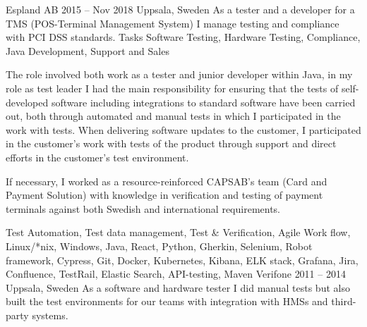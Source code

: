 \documentclass{sobCV}[2015/09/08]
\begin{document}
   {Espland AB}
   {2015 -- Nov 2018}
   {Uppsala, Sweden}{
       As a tester and a developer for a TMS (POS-Terminal Management System) I
       manage testing and compliance with PCI DSS standards.
   }
   {Tasks}{
       Software Testing,
       Hardware Testing,
       Compliance, 
       Java Development,
       Support and Sales
 }{  %
      {
          The role involved both work as a tester and junior developer within
          Java, in my role as test leader I had the main responsibility for
          ensuring that the tests of self-developed software including
          integrations to standard software have been carried out, both through
          automated and manual tests in which I participated in the work with
          tests.  When delivering software updates to the customer, I
          participated in the customer's work with tests of the product through
          support and direct efforts in the customer's test environment.  

          If necessary, I worked as a  resource-reinforced CAPSAB's team (Card
          and Payment Solution) with knowledge in verification and testing of
          payment terminals against both Swedish and international
          requirements.
     }
 }{
       Test Automation,
       Test data management,
       Test \& Verification,
       Agile Work flow, 
       Linux/*nix, 
       Windows, 
       Java, 
       React, 
       Python, 
       Gherkin, 
       Selenium, 
       Robot framework,
       Cypress, 
       Git, 
       Docker, 
       Kubernetes, 
       Kibana, 
       ELK stack, 
       Grafana, 
       Jira, 
       Confluence, 
       TestRail, 
       Elastic Search, 
       API-testing, 
       Maven 
}
   {Verifone}
   {2011 -- 2014}
   {Uppsala, Sweden}{
       As a software and hardware tester I did manual tests but also built the
       test environments for our teams with integration with HMSs and
       third-party systems.
   }
\end{document}
